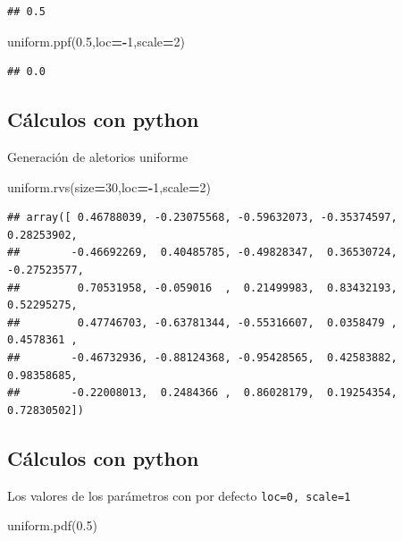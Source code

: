 \documentclass[]{book}
\newenvironment{Shaded}{\begin{snugshade}}{\end{snugshade}}
\newcommand{\DecValTok}[1]{\textcolor[rgb]{0.00,0.00,0.81}{#1}}
\newcommand{\FloatTok}[1]{\textcolor[rgb]{0.00,0.00,0.81}{#1}}
\newcommand{\NormalTok}[1]{#1}
\newcommand{\OperatorTok}[1]{\textcolor[rgb]{0.81,0.36,0.00}{\textbf{#1}}}
\begin{document}
\begin{verbatim}
## 0.5
\end{verbatim}

\begin{Shaded}
\begin{Highlighting}[]
\NormalTok{uniform.ppf(}\FloatTok{0.5}\NormalTok{,loc}\OperatorTok{=-}\DecValTok{1}\NormalTok{,scale}\OperatorTok{=}\DecValTok{2}\NormalTok{)}
\end{Highlighting}
\end{Shaded}

\begin{verbatim}
## 0.0
\end{verbatim}

\hypertarget{cuxe1lculos-con-python-15}{%
\subsection{Cálculos con python}\label{cuxe1lculos-con-python-15}}

Generación de aletorios uniforme

\begin{Shaded}
\begin{Highlighting}[]
\NormalTok{uniform.rvs(size}\OperatorTok{=}\DecValTok{30}\NormalTok{,loc}\OperatorTok{=-}\DecValTok{1}\NormalTok{,scale}\OperatorTok{=}\DecValTok{2}\NormalTok{)}
\end{Highlighting}
\end{Shaded}

\begin{verbatim}
## array([ 0.46788039, -0.23075568, -0.59632073, -0.35374597,  0.28253902,
##        -0.46692269,  0.40485785, -0.49828347,  0.36530724, -0.27523577,
##         0.70531958, -0.059016  ,  0.21499983,  0.83432193,  0.52295275,
##         0.47746703, -0.63781344, -0.55316607,  0.0358479 ,  0.4578361 ,
##        -0.46732936, -0.88124368, -0.95428565,  0.42583882,  0.98358685,
##        -0.22008013,  0.2484366 ,  0.86028179,  0.19254354,  0.72830502])
\end{verbatim}

\hypertarget{cuxe1lculos-con-python-16}{%
\subsection{Cálculos con python}\label{cuxe1lculos-con-python-16}}

Los valores de los parámetros con por defecto \texttt{loc=0,\ scale=1}

\begin{Shaded}
\begin{Highlighting}[]
\NormalTok{uniform.pdf(}\FloatTok{0.5}\NormalTok{)}
\end{Highlighting}
\end{Shaded}
\end{document}
